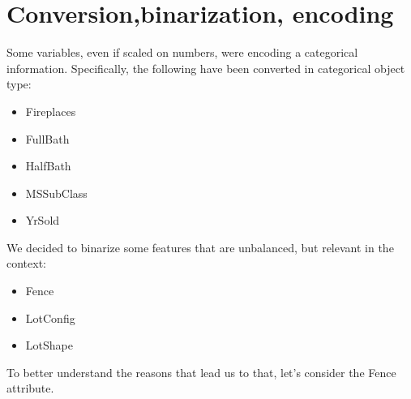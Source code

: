 \section{Conversion,binarization, encoding}
Some variables, even if scaled on numbers, were encoding a categorical information. Specifically, the following have been converted in categorical object type: 
\begin{itemize}
    \item Fireplaces
    \item FullBath
    \item HalfBath
    \item MSSubClass
    \item YrSold
\end{itemize}

We decided to binarize some features that are unbalanced, but relevant in the context:
\begin{itemize}
    \item Fence
    \item LotConfig
    \item LotShape
\end{itemize}

To better understand the reasons that lead us to that, let's consider the Fence attribute.

